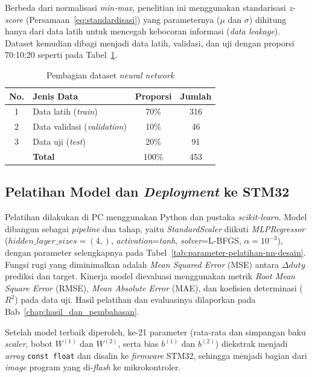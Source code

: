 Berbeda dari normalisasi \emph{min-max}, penelitian ini menggunakan
standarisasi \emph{z-score} (Persamaan~\ref{eq:standardisasi}) yang
parameternya ($\mu$ dan $\sigma$) dihitung hanya dari data latih untuk
mencegah kebocoran informasi (\emph{data leakage}). Dataset kemudian
dibagi menjadi data latih, validasi, dan uji dengan proporsi 70:10:20
seperti pada Tabel~\ref{tab:pembagian-dataset-desain}.

\begin{table}[H]
  \centering
  \caption{Pembagian dataset \emph{neural network}}
  \label{tab:pembagian-dataset-desain}
  \begin{tabular}{|c|>{\raggedright\arraybackslash}p{3.2cm}|c|c|}
  \hline
  \textbf{No.} & \textbf{Jenis Data} & \textbf{Proporsi} &
  \textbf{Jumlah} \\
  \hline
  1 & Data latih (\emph{train}) & 70\% & 316 \\
  \hline
  2 & Data validasi (\emph{validation}) & 10\% & 46 \\
  \hline
  3 & Data uji (\emph{test}) & 20\% & 91 \\
  \hline
    & \textbf{Total} & 100\% & 453 \\
  \hline
  \end{tabular}
\end{table}

\subsection{Pelatihan Model dan \emph{Deployment} ke STM32}
\label{sec:pelatihan-model-dan-deployment}

Pelatihan dilakukan di PC menggunakan Python dan pustaka
\emph{scikit-learn}. Model dibangun sebagai \emph{pipeline} dua tahap,
yaitu \emph{StandardScaler} diikuti \emph{MLPRegressor}
($hidden\_layer\_sizes=(4,)$, \emph{activation}=\emph{tanh},
\emph{solver}=L-BFGS, $\alpha=10^{-3}$), dengan parameter selengkapnya
pada Tabel~\ref{tab:parameter-pelatihan-nn-desain}. Fungsi rugi yang
diminimalkan adalah \emph{Mean Squared Error} (MSE) antara $\Delta duty$
prediksi dan target. Kinerja model dievaluasi menggunakan metrik
\emph{Root Mean Square Error} (RMSE), \emph{Mean Absolute Error} (MAE),
dan koefisien determinasi ($R^2$) pada data uji. Hasil pelatihan dan
evaluasinya dilaporkan pada Bab~\ref{chap:hasil_dan_pembahasan}.

Setelah model terbaik diperoleh, ke-21 parameter (rata-rata dan
simpangan baku \emph{scaler}, bobot $W^{(1)}$ dan $W^{(2)}$, serta bias
$b^{(1)}$ dan $b^{(2)}$) diekstrak menjadi \emph{array} \texttt{const
float} dan disalin ke \emph{firmware} STM32, sehingga menjadi bagian
dari \emph{image} program yang di-\emph{flash} ke mikrokontroler.

